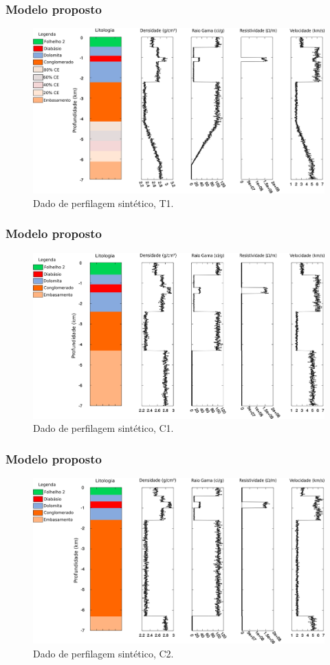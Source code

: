 \documentclass[aspectratio=10]{beamer} %
\begin{document}
\begin{frame}
\frametitle{Modelo proposto}
\begin{figure}[H]
\centering
\includegraphics[scale=0.37]{Imagens/PocoT1.png}
\caption{Dado de perfilagem sintético, T1. }
\label{T1}
\end{figure}
\end{frame}


\begin{frame}
\frametitle{Modelo proposto}
\begin{figure}[H]
\centering
\includegraphics[scale=0.37]{Imagens/PocoC1.png}
\caption{Dado de perfilagem sintético, C1.}
\label{C1}
\end{figure}
\end{frame}

\begin{frame}
\frametitle{Modelo proposto}
\begin{figure}[H]
\centering
\includegraphics[scale=0.37]{Imagens/PocoC2.png}
\caption{Dado de perfilagem sintético, C2.}
\label{C2}
\end{figure}
\end{frame}
\end{document}
